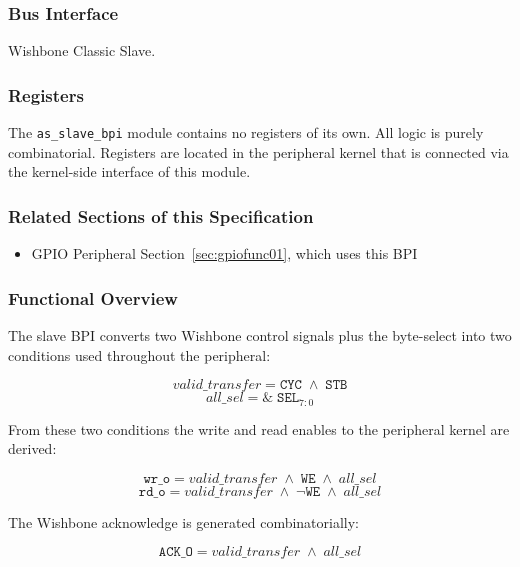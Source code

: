 \subsubsection{Bus Interface}

Wishbone Classic Slave.

\subsubsection{Registers}

The \texttt{as\_slave\_bpi} module contains no registers of its own.
All logic is purely combinatorial.
Registers are located in the peripheral kernel that is connected via the
kernel-side interface of this module.

\subsubsection{Related Sections of this Specification}

\begin{itemize}
  \item GPIO Peripheral Section~\ref{sec:gpiofunc01}, which uses this BPI
\end{itemize}

\subsubsection{Functional Overview}

The slave BPI converts two Wishbone control signals plus the byte-select
into two conditions used throughout the peripheral:

\[
  \textit{valid\_transfer} = \texttt{CYC} \;\land\; \texttt{STB}
\]
\[
  \textit{all\_sel} = \&\;\texttt{SEL}_{7:0}
\]

From these two conditions the write and read enables to the peripheral
kernel are derived:

\[
  \texttt{wr\_o} = \textit{valid\_transfer} \;\land\; \texttt{WE} \;\land\; \textit{all\_sel}
\]
\[
  \texttt{rd\_o} = \textit{valid\_transfer} \;\land\; \lnot\texttt{WE} \;\land\; \textit{all\_sel}
\]

The Wishbone acknowledge is generated combinatorially:

\[
  \texttt{ACK\_O} = \textit{valid\_transfer} \;\land\; \textit{all\_sel}
\]


